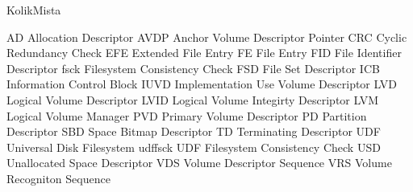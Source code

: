 \begin{seznamzkratek}{KolikMista}

        {AD}
        {Allocation Descriptor}
        {AVDP}
        {Anchor Volume Descriptor Pointer}
        {CRC}
        {Cyclic Redundancy Check}
        {EFE}
        {Extended File Entry}
        {FE}
        {File Entry}
        {FID}
        {File Identifier Descriptor}
        {fsck}
        {Filesystem Consistency Check}
        {FSD}
        {File Set Descriptor}
        {ICB}
        {Information Control Block}
        {IUVD}
        {Implementation Use Volume Descriptor}
        {LVD}
        {Logical Volume Descriptor}
        {LVID}
        {Logical Volume Integirty Descriptor}
        {LVM}
        {Logical Volume Manager}
        {PVD}
        {Primary Volume Descriptor}
        {PD}
        {Partition Descriptor}
        {SBD}
        {Space Bitmap Descriptor}
        {TD}
        {Terminating Descriptor}
        {UDF}
        {Universal Disk Filesystem}
        {udffsck}
        {UDF Filesystem Consistency Check}
        {USD}
        {Unallocated Space Descriptor}
        {VDS}
        {Volume Descriptor Sequence}
        {VRS}
        {Volume Recogniton Sequence}
\end{seznamzkratek}
